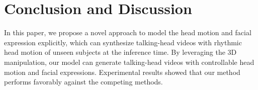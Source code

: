 \documentclass[runningheads]{llncs}
\begin{document}

\section{Conclusion and Discussion}
In this paper, we propose a novel approach to model the head motion and facial expression explicitly, which can synthesize talking-head videos with rhythmic head motion of unseen subjects at the inference time. By leveraging the 3D manipulation, our model can generate talking-head videos with controllable head motion and facial expressions. Experimental results showed that our method performs favorably against the competing methods.
  

\clearpage



\end{document}
